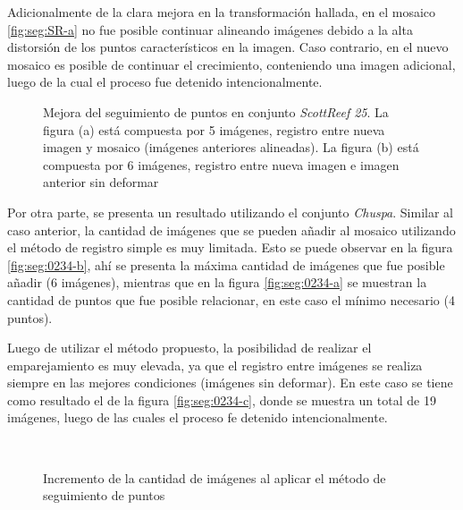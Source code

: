 Adicionalmente de la clara mejora en la transformación hallada, en el mosaico \ref{fig:seg:SR-a} no fue posible continuar alineando imágenes debido a la alta distorsión de los puntos característicos en la imagen. Caso contrario, en el nuevo mosaico es posible de continuar el crecimiento, conteniendo una imagen adicional, luego de la cual el proceso fue detenido intencionalmente. 

\begin{figure}[h]
	\centering     %
	\hspace{1mm}%
	
	\caption[Seguimiento de puntos: \textit{ScottReef 25}]{Mejora del seguimiento de puntos en conjunto \textit{ScottReef 25}. La figura (a) está compuesta por 5 imágenes, registro entre nueva imagen y mosaico (imágenes anteriores alineadas). La figura (b) está compuesta por 6 imágenes, registro entre nueva imagen e imagen anterior sin deformar}
	\label{imagen:seg:SR}
\end{figure}

Por otra parte, se presenta un resultado utilizando el conjunto \textit{Chuspa}. Similar al caso anterior, la cantidad de imágenes que se pueden añadir al mosaico utilizando el método de registro simple es muy limitada. Esto se puede observar en la figura \ref{fig:seg:0234-b}, ahí se presenta la máxima cantidad de imágenes que fue posible añadir (6 imágenes), mientras que en la figura \ref{fig:seg:0234-a} se muestran la cantidad de puntos que fue posible relacionar, en este caso el mínimo necesario (4 puntos). 

Luego de utilizar el método propuesto, la posibilidad de realizar el emparejamiento es muy elevada, ya que el registro entre imágenes se realiza siempre en las mejores condiciones (imágenes sin deformar). En este caso se tiene como resultado el de la figura \ref{fig:seg:0234-c}, donde se muestra un total de 19 imágenes, luego de las cuales el proceso fe detenido intencionalmente.

\begin{figure}[H]
	\centering
	\begin{varwidth}{0.49\linewidth}  %
		\centering
		\\
	\end{varwidth}
	\begin{varwidth}{0.50\linewidth}  %
		\centering
		\color{white}
		\color{black}
	\end{varwidth}
	
	\caption[Mejora de aplicar seguimiento de puntos]{Incremento de la cantidad de imágenes al aplicar el método de seguimiento de puntos} 
	\label{imagen:seg:0234}
\end{figure}


